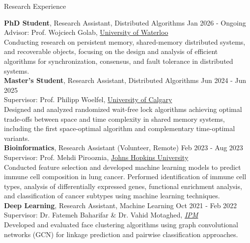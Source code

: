 \documentclass{resume} %
\begin{document}
\begin{rSection}{Research Experience}

{\bf PhD Student}{, Research Assistant, Distributed Algorithms \hfill {Jan 2026 - Ongoing}\\ Advisor: Prof. Wojciech Golab, \href{https://uwaterloo.ca/}{University of Waterloo}}\\
Conducting research on persistent memory, shared-memory distributed systems, and recoverable objects, focusing on the design and analysis of efficient algorithms for synchronization, consensus, and fault tolerance in distributed systems.\\
{\bf Master's Student}{, Research Assistant, Distributed Algorithms \hfill {Jun 2024 - Jun 2025}\\ Supervisor: Prof. Philipp Woelfel, \href{https://www.ucalgary.ca/}{University of Calgary}}\\
Designed and analyzed randomized wait-free lock algorithms achieving optimal trade-offs between space and time complexity in shared memory systems, including the first space-optimal algorithm and complementary time-optimal variants.\\
{\bf Bioinformatics}{, Research Assistant (Volunteer, Remote) \hfill { Feb 2023 - Aug 2023}\\ Supervisor: Prof. Mehdi Pirooznia, \href{https://www.jhu.edu/}{Johns Hopkins University}}\\
Conducted feature selection and developed machine learning models to predict immune cell composition in lung cancer. Performed identification of immune cell types, analysis of differentially expressed genes, functional enrichment analysis, and classification of cancer subtypes using machine learning techniques.\\
{\bf Deep Learning}{, Research Assistant, Machine Learning \hfill { Oct 2021 - Feb 2022}\\ Supervisor: Dr. Fatemeh Baharifar \& Dr. Vahid Motaghed, \textit{\href{https://ipm.ac.ir/}{IPM}}}\\
Developed and evaluated face clustering algorithms using graph convolutional networks (GCN) for linkage prediction and pairwise classification approaches.

\end{rSection}
\end{document}
